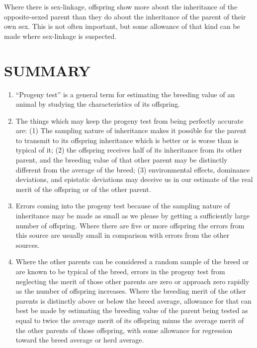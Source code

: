 Where there is sex-linkage, offspring show more about the inheritance
of the opposite-sexed parent than they do about the inheritance of
the parent of their own sex. This is not often important, but some
allowance of that kind can be made where sex-linkage is suspected.

\section*{SUMMARY}

\begin{enumerate}
\item ``Progeny test'' is a general term for estimating the breeding value
of an animal by studying the characteristics of its offspring.

\item The things which may keep the progeny test from being perfectly
accurate are: (1) The sampling nature of inheritance makes it possible
for the parent to transmit to its offspring inheritance which is better or
is worse than is typical of it; (2) the offspring receives half of its inheritance
from its other parent, and the breeding value of that other parent
may be distinctly different from the average of the breed; (3) environmental
effects, dominance deviations, and epistatic deviations may
deceive us in our estimate of the real merit of the offspring or of the
other parent.

\item Errors coming into the progeny test because of the sampling
nature of inheritance may be made as small as we please by getting a
sufficiently large number of offspring. Where there are five or more offspring
the errors from this source are usually small in comparison with
errors from the other sources.

\item Where the other parents can be considered a random sample of
the breed or are known to be typical of the breed, errors in the progeny
test from neglecting the merit of those other parents are zero or
approach zero rapidly as the number of offspring increases. Where the
breeding merit of the other parents is distinctly above or below the
breed average, allowance for that can best be made by estimating the
breeding value of the parent being tested as equal to twice the average
merit of its offspring minus the average merit of the other parents of
those offspring, with some allowance for regression toward the breed
average or herd average.


\end{enumerate}
